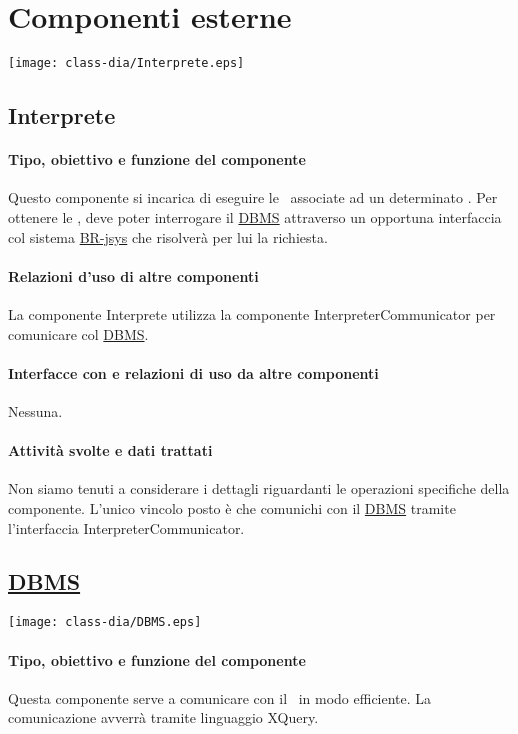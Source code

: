 \chapter{Componenti esterne}
\begin{center}
 \texttt{[image: class-dia/Interprete.eps]}
\end{center}
\section{Interprete}
\subsubsection{Tipo, obiettivo e funzione del componente}
Questo componente si incarica di eseguire le \brs\ associate ad un determinato \bo. Per ottenere le \brs, deve poter interrogare il \underline{DBMS} attraverso un opportuna interfaccia col sistema \underline{BR-jsys} che risolver\`a per lui la richiesta.
\subsubsection{Relazioni d'uso di altre componenti}
La componente Interprete utilizza la componente InterpreterCommunicator per comunicare col \underline{DBMS}.
\subsubsection{Interfacce con e relazioni di uso da altre componenti}
Nessuna.
\subsubsection{Attivit\`a svolte e dati trattati}
Non siamo tenuti a considerare i dettagli riguardanti le operazioni specifiche della componente. L'unico vincolo posto \`e che comunichi con il \underline{DBMS} tramite l'interfaccia InterpreterCommunicator.
\section{\underline{DBMS}}
\begin{center}
 \texttt{[image: class-dia/DBMS.eps]}
\end{center}
\subsubsection{Tipo, obiettivo e funzione del componente}
Questa componente serve a comunicare con il \rp\ in modo efficiente. La comunicazione avverr\`a tramite linguaggio XQuery.
